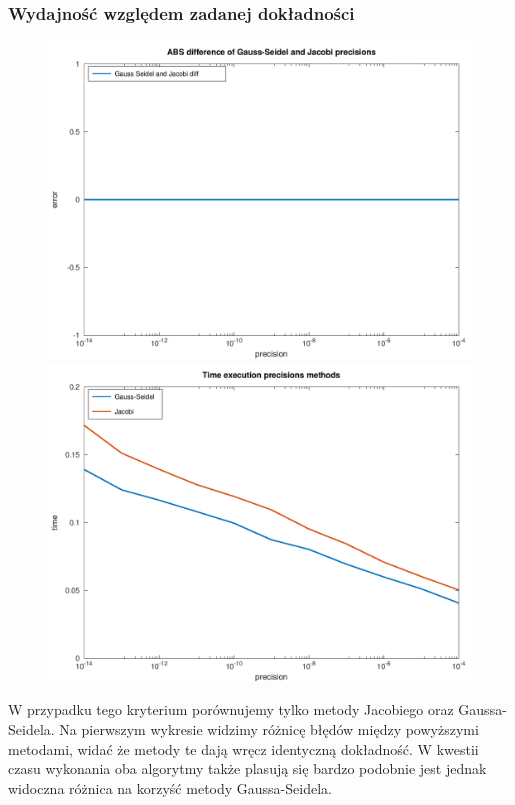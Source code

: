 \documentclass[10pt]{article}
\begin{document}
\subsubsection{Wydajność względem zadanej dokładności}
\begin{figure}[h]
\centering
\includegraphics[scale=0.45]{plots/05_abs_precision_methods_all_rows.png}
\includegraphics[scale=0.45]{plots/06_time_precision_methods_all_rows.png}
\end{figure}
W przypadku tego kryterium porównujemy tylko metody Jacobiego oraz Gaussa-Seidela. Na pierwszym wykresie widzimy różnicę błędów między powyższymi metodami, widać że metody te dają wręcz identyczną dokładność. W kwestii czasu wykonania oba algorytmy także plasują się bardzo podobnie jest jednak widoczna różnica na korzyść metody Gaussa-Seidela.
\end{document}
